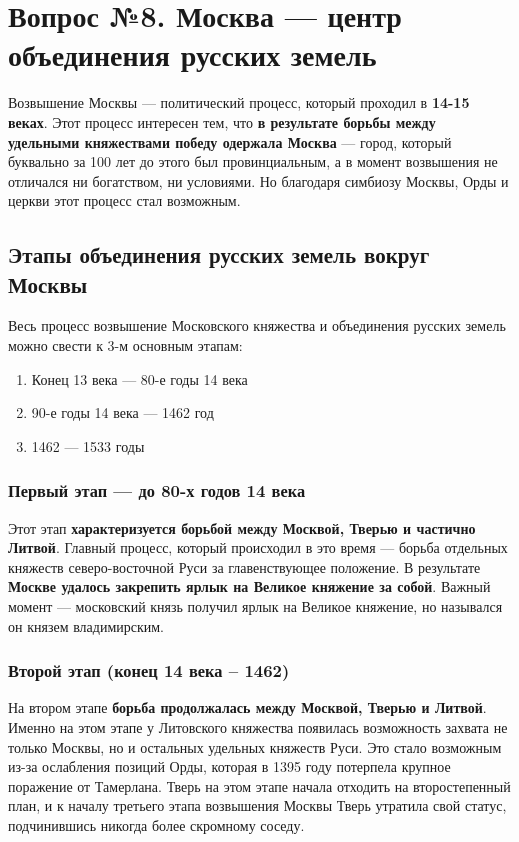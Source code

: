 \documentclass{article}
\begin{document}
\pagebreak
\section{Вопрос №8. Москва — центр объединения русских земель}

Возвышение Москвы — политический процесс, который проходил в \textbf{14-15 веках}. Этот процесс интересен тем, что \textbf{в результате борьбы между удельными княжествами победу одержала Москва} — город, который буквально за 100 лет до этого был провинциальным, а в момент возвышения не отличался ни богатством, ни условиями. Но благодаря симбиозу Москвы, Орды и церкви этот процесс стал возможным.

\subsection{Этапы объединения русских земель вокруг Москвы}

Весь процесс возвышение Московского княжества и объединения русских земель можно свести к 3-м основным этапам:

\begin{enumerate}
    \item Конец 13 века — 80-е годы 14 века
    \item 90-е годы 14 века — 1462 год
    \item 1462 — 1533 годы
\end{enumerate}

\subsubsection{Первый этап — до 80-х годов 14 века}

Этот этап \textbf{характеризуется борьбой между Москвой, Тверью и частично Литвой}. Главный процесс, который происходил в это время — борьба отдельных княжеств северо-восточной Руси за главенствующее положение. В результате \textbf{Москве удалось закрепить ярлык на Великое княжение за собой}. Важный момент — московский князь получил ярлык на Великое княжение, но назывался он князем владимирским.

\subsubsection{Второй этап (конец 14 века – 1462)}

На втором этапе \textbf{борьба продолжалась между Москвой, Тверью и Литвой}. Именно на этом этапе у Литовского княжества появилась возможность захвата не только Москвы, но и остальных удельных княжеств Руси. Это стало возможным из-за ослабления позиций Орды, которая в 1395 году потерпела крупное поражение от Тамерлана. Тверь на этом этапе начала отходить на второстепенный план, и к началу третьего этапа возвышения Москвы Тверь утратила свой статус, подчинившись никогда более скромному соседу.
\end{document}
